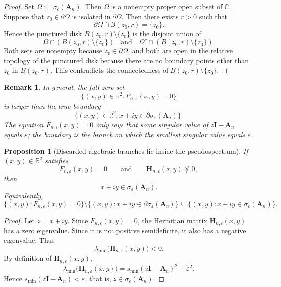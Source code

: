\documentclass[11pt]{article}
\newtheorem{proposition}[theorem]{Proposition}
\newtheorem{remark}[theorem]{Remark}
\begin{document}
\begin{proof}
Set \(\Omega:=\sigma_\varepsilon(\mathbf{A}_n)\). Then \(\Omega\) is a nonempty proper open subset of \(\mathbb{C}\).
Suppose that \(z_0\in\partial\Omega\) is isolated in \(\partial\Omega\). Then there exists \(r>0\) such that
\[
\partial\Omega\cap B(z_0,r)=\{z_0\}.
\]
Hence the punctured disk \(B(z_0,r)\setminus\{z_0\}\) is the disjoint union of
\[
\Omega\cap (B(z_0,r)\setminus\{z_0\})
\quad\text{and}\quad
\Omega^c\cap (B(z_0,r)\setminus\{z_0\}).
\]
Both sets are nonempty because \(z_0\in\partial\Omega\), and both are open in the relative topology of the punctured disk because there are no boundary points other than \(z_0\) in \(B(z_0,r)\). This contradicts the connectedness of \(B(z_0,r)\setminus\{z_0\}\).
\end{proof}

\begin{remark}\label{rem:not-exact-algebraic-curve}
In general, the full zero set
\[
\bigl\{(x,y)\in\mathbb{R}^2:F_{n,\varepsilon}(x,y)=0\bigr\}
\]
is larger than the true boundary
\[
\bigl\{(x,y)\in\mathbb{R}^2:x+iy\in \partial\sigma_\varepsilon(\mathbf{A}_n)\bigr\}.
\]
The equation \(F_{n,\varepsilon}(x,y)=0\) only says that \emph{some} singular value of
\(z\mathbf{I}-\mathbf{A}_n\) equals \(\varepsilon\); the boundary is the branch on which the
\emph{smallest} singular value equals \(\varepsilon\).
\end{remark}

\begin{proposition}[Discarded algebraic branches lie inside the pseudospectrum]\label{prop:discarded-branches-inside}
If \((x,y)\in\mathbb{R}^2\) satisfies
\[
F_{n,\varepsilon}(x,y)=0
\qquad\text{and}\qquad
\mathbf{H}_{n,\varepsilon}(x,y)\not\succeq 0,
\]
then
\[
x+iy\in \sigma_\varepsilon(\mathbf{A}_n).
\]
Equivalently,
\[
\bigl\{(x,y):F_{n,\varepsilon}(x,y)=0\bigr\}
\setminus
\bigl\{(x,y):x+iy\in \partial\sigma_\varepsilon(\mathbf{A}_n)\bigr\}
\subseteq
\bigl\{(x,y):x+iy\in \sigma_\varepsilon(\mathbf{A}_n)\bigr\}.
\]
\end{proposition}

\begin{proof}
Let \(z=x+iy\). Since \(F_{n,\varepsilon}(x,y)=0\), the Hermitian matrix \(\mathbf{H}_{n,\varepsilon}(x,y)\) has a zero eigenvalue. Since it is not positive semidefinite, it also has a negative eigenvalue. Thus
\[
\lambda_{\min}\bigl(\mathbf{H}_{n,\varepsilon}(x,y)\bigr)<0.
\]
By definition of \(\mathbf{H}_{n,\varepsilon}(x,y)\),
\[
\lambda_{\min}\bigl(\mathbf{H}_{n,\varepsilon}(x,y)\bigr)
=s_{\min}(z\mathbf{I}-\mathbf{A}_n)^2-\varepsilon^2.
\]
Hence \(s_{\min}(z\mathbf{I}-\mathbf{A}_n)<\varepsilon\), that is, \(z\in\sigma_\varepsilon(\mathbf{A}_n)\).
\end{proof}
\end{document}
